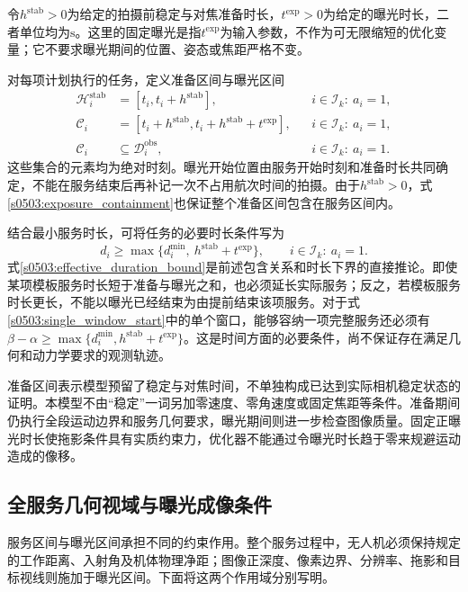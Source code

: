 令$h^{\mathrm{stab}}>0$为给定的拍摄前稳定与对焦准备时长，$t^{\mathrm{exp}}>0$为给定的曝光时长，二者单位均为$\mathrm{s}$。这里的固定曝光是指$t^{\mathrm{exp}}$为输入参数，不作为可无限缩短的优化变量；它不要求曝光期间的位置、姿态或焦距严格不变。

对每项计划执行的任务，定义准备区间与曝光区间
\begin{align}
 \mathcal H_i^{\mathrm{stab}}
 &=[t_i,t_i+h^{\mathrm{stab}}],
 &&i\in\mathcal I_k:\ a_i=1,
 \label{s0503:stabilization_interval}\\
 \mathcal C_i
 &=[t_i+h^{\mathrm{stab}},
     t_i+h^{\mathrm{stab}}+t^{\mathrm{exp}}],
 &&i\in\mathcal I_k:\ a_i=1,
 \label{s0503:exposure_interval}\\
 \mathcal C_i&\subseteq\mathcal D_i^{\mathrm{obs}},
 &&i\in\mathcal I_k:\ a_i=1.
 \label{s0503:exposure_containment}
\end{align}
这些集合的元素均为绝对时刻。曝光开始位置由服务开始时刻和准备时长共同确定，不能在服务结束后再补记一次不占用航次时间的拍摄。由于$h^{\mathrm{stab}}>0$，式\eqref{s0503:exposure_containment}也保证整个准备区间包含在服务区间内。

结合最小服务时长，可将任务的必要时长条件写为
\begin{equation}
 d_i\ge\max\{d_i^{\min},\ h^{\mathrm{stab}}+t^{\mathrm{exp}}\},
 \qquad i\in\mathcal I_k:\ a_i=1.
 \label{s0503:effective_duration_bound}
\end{equation}
式\eqref{s0503:effective_duration_bound}是前述包含关系和时长下界的直接推论。即使某项模板服务时长短于准备与曝光之和，也必须延长实际服务；反之，若模板服务时长更长，不能以曝光已经结束为由提前结束该项服务。对于式\eqref{s0503:single_window_start}中的单个窗口，能够容纳一项完整服务还必须有$\beta-\alpha\ge\max\{d_i^{\min},h^{\mathrm{stab}}+t^{\mathrm{exp}}\}$。这是时间方面的必要条件，尚不保证存在满足几何和动力学要求的观测轨迹。

准备区间表示模型预留了稳定与对焦时间，不单独构成已达到实际相机稳定状态的证明。本模型不由“稳定”一词另加零速度、零角速度或固定焦距等条件。准备期间仍执行全段运动边界和服务几何要求，曝光期间则进一步检查图像质量。固定正曝光时长使拖影条件具有实质约束力，优化器不能通过令曝光时长趋于零来规避运动造成的像移。

\subsection{全服务几何视域与曝光成像条件}

服务区间与曝光区间承担不同的约束作用。整个服务过程中，无人机必须保持规定的工作距离、入射角及机体物理净距；图像正深度、像素边界、分辨率、拖影和目标视线则施加于曝光区间。下面将这两个作用域分别写明。

